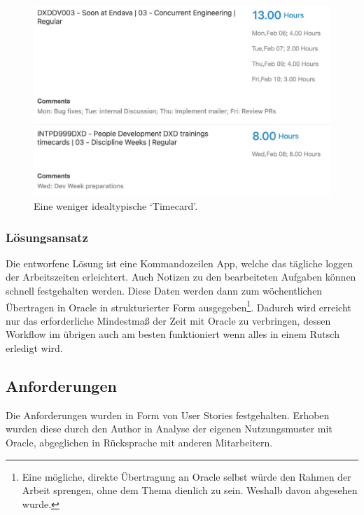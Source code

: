 \documentclass[oneside,bibliography=totocnumbered,BCOR=5mm]{scrbook}
\begin{document}
\begin{figure}[H]
  \centering
  \includegraphics[scale=0.25]{oracle-real.png}
  \caption{Eine weniger idealtypische `Timecard'.}
\end{figure}

\subsubsection{Lösungsansatz}

Die entworfene Lösung ist eine Kommandozeilen App, welche das tägliche loggen
der Arbeitszeiten erleichtert. Auch Notizen zu den bearbeiteten Aufgaben
können schnell festgehalten werden. Diese Daten werden dann zum wöchentlichen
Übertragen in Oracle in strukturierter Form ausgegeben\footnote{Eine mögliche,
direkte Übertragung an Oracle selbst würde den Rahmen der Arbeit sprengen,
ohne dem Thema dienlich zu sein. Weshalb davon abgesehen wurde.}. Dadurch wird
erreicht nur das erforderliche Mindestmaß der Zeit mit Oracle zu verbringen,
dessen Workflow im übrigen auch am besten funktioniert wenn alles in einem
Rutsch erledigt wird.

\subsection{Anforderungen}

Die Anforderungen wurden in Form von User Stories festgehalten. Erhoben wurden
diese durch den Author in Analyse der eigenen Nutzungsmuster mit Oracle,
abgeglichen in Rücksprache mit anderen Mitarbeitern.
\end{document}
